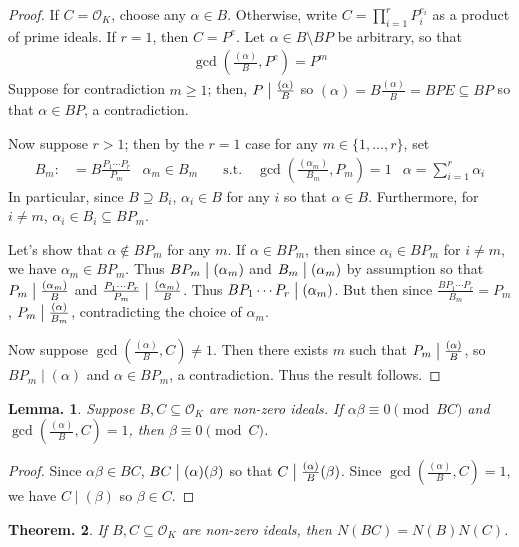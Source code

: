 \documentclass[11pt, a4paper]{memoir}
\renewcommand{\div}{\bigm|}
\theoremstyle{change}
\newtheorem{theorem}{Theorem.}[section]
\newtheorem{lemma}[theorem]{Lemma.}
\theoremstyle{plain}
\theoremstyle{nonumberplain}
\newtheorem{proof}{Proof}
\numberwithin{equation}{section}
\begin{document}
\begin{proof}
    If $C=\mathcal{O}_K$, choose any $\alpha\in B$.
    Otherwise, write $C=\prod_{i=1}^r P_i^{e_i}$ as a product of prime ideals.
    If $r=1$, then $C=P^e$.
    Let $\alpha\in B\setminus BP$ be arbitrary, so that
    \begin{align*}
        \gcd\left(\frac{(\alpha)}{B},P^e\right)=P^m
    \end{align*}
    Suppose for contradiction $m\geq 1$; then, $P\div\frac{(\alpha)}{B}$ so $(\alpha)=B\frac{(\alpha)}{B}=BP E\subseteq BP$ so that $\alpha\in BP$, a contradiction.

    Now suppose $r>1$; then by the $r=1$ case for any $m\in\{1,\ldots,r\}$, set
    \begin{align*}
        B_m:&=B\frac{P_1\cdots P_r}{P_m} & \alpha_m \in B_m &\quad\text{s.t.}\quad\gcd\left(\frac{(\alpha_m)}{B_m},P_m\right)=1 & \alpha=\sum_{i=1}^r\alpha_i
    \end{align*}
    In particular, since $B\supseteq B_i$, $\alpha_i\in B$ for any $i$ so that $\alpha\in B$.
    Furthermore, for $i\neq m$, $\alpha_i\in B_i\subseteq BP_m$.

    Let's show that $\alpha\notin BP_m$ for any $m$.
    If $\alpha\in BP_m$, then since $\alpha_i\in BP_m$ for $i\neq m$, we have $\alpha_m\in BP_m$.
    Thus $BP_m\div(\alpha_m)$ and $B_m\div(\alpha_m)$ by assumption so that $P_m\div\frac{(\alpha_m)}{B}$ and $\frac{P_1\cdots P_r}{P_m}\div\frac{(\alpha_m)}{B}$.
    Thus $BP_1\cdots P_r\div(\alpha_m)$.
    But then since $\frac{BP_1\cdots P_r}{B_m}=P_m$, $P_m\div\frac{(\alpha)}{B_m}$, contradicting the choice of $\alpha_m$.

    Now suppose $\gcd\left(\frac{(\alpha)}{B},C\right)\neq 1$.
    Then there exists $m$ such that $P_m\div\frac{(\alpha)}{B}$, so $BP_m\mid(\alpha)$ and $\alpha\in BP_m$, a contradiction.
    Thus the result follows.
\end{proof}
\begin{lemma}\label{l:gcd-cp}
    Suppose $B,C\subseteq\mathcal{O}_K$ are non-zero ideals.
    If $\alpha\beta\equiv 0\pmod{BC}$ and $\gcd\left(\frac{(\alpha)}{B},C\right)=1$, then $\beta\equiv 0\pmod{C}$.
\end{lemma}
\begin{proof}
    Since $\alpha\beta\in BC$, $BC\div(\alpha)(\beta)$ so that $C\div\frac{(\alpha)}{B}(\beta)$.
    Since $\gcd\left(\frac{(\alpha)}{B},C\right)=1$, we have $C\mid(\beta)$ so $\beta\in C$.
\end{proof}
\begin{theorem}
    If $B,C\subseteq\mathcal{O}_K$ are non-zero ideals, then $N(BC)=N(B)N(C)$.
\end{theorem}
\end{document}
